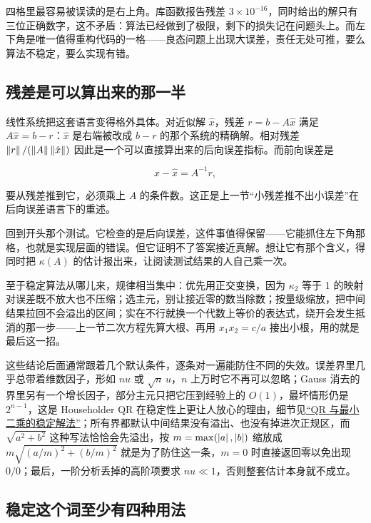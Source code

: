 四格里最容易被误读的是右上角。库函数报告残差 \(3\times10^{-16}\)，同时给出的解只有三位正确数字，这不矛盾：算法已经做到了极限，剩下的损失记在问题头上。而左下角是唯一值得重构代码的一格——良态问题上出现大误差，责任无处可推，要么算法不稳定，要么实现有错。

\subsection{残差是可以算出来的那一半}

线性系统把这套语言变得格外具体。对近似解 \(\hat x\)，残差 \(r=b-A\hat x\) 满足 \(A\hat x=b-r\)：\(\hat x\) 是右端被改成 \(b-r\) 的那个系统的精确解。相对残差 \(\left\lVert r\right\rVert/(\left\lVert A\right\rVert\left\lVert\hat x\right\rVert)\) 因此是一个可以直接算出来的后向误差指标。而前向误差是

\[
x-\hat x=A^{-1}r,
\]

要从残差推到它，必须乘上 \(A\) 的条件数。这正是上一节``小残差推不出小误差''在后向误差语言下的重述。

回到开头那个测试。它检查的是后向误差，这件事值得保留——它能抓住左下角那格，也就是实现层面的错误。但它证明不了答案接近真解。想让它有那个含义，得同时把 \(\kappa(A)\) 的估计报出来，让阅读测试结果的人自己乘一次。

至于稳定算法从哪儿来，规律相当集中：优先用正交变换，因为 \(\kappa_2\) 等于 1 的映射对误差既不放大也不压缩；选主元，别让接近零的数当除数；按量级缩放，把中间结果拉回不会溢出的区间；实在不行就换一个代数上等价的表达式，绕开会发生抵消的那一步——上一节二次方程先算大根、再用 \(x_1x_2=c/a\) 接出小根，用的就是最后这一招。

这些结论后面通常跟着几个默认条件，逐条对一遍能防住不同的失效。误差界里几乎总带着维数因子，形如 \(nu\) 或 \(\sqrt{n}\,u\)，\(n\) 上万时它不再可以忽略；Gauss 消去的界里另有一个增长因子，部分主元只把它压到经验上的 \(O(1)\)，最坏情形仍是 \(2^{n-1}\)，这是 Householder QR 在稳定性上更让人放心的理由，细节见\hyperref[sec:08-Numerical-Analysis/05-Numerical-Linear-Algebra/02]{``QR 与最小二乘的稳定解法''}；所有界都默认中间结果没有溢出、也没有掉进次正规区，而 \(\sqrt{a^{2}+b^{2}}\) 这种写法恰恰会先溢出，按 \(m=\max(\left|a\right|,\left|b\right|)\) 缩放成 \(m\sqrt{(a/m)^{2}+(b/m)^{2}}\) 就是为了防住这一条，\(m=0\) 时直接返回零以免出现 \(0/0\)；最后，一阶分析丢掉的高阶项要求 \(nu\ll1\)，否则整套估计本身就不成立。

\subsection{稳定这个词至少有四种用法}

